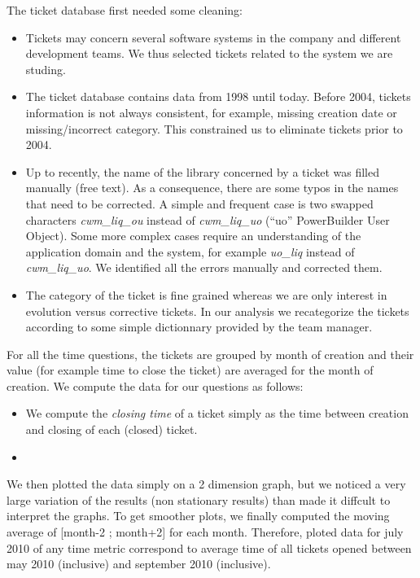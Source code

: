 \documentclass[10pt,conference]{IEEEtran}
\begin{document}
The ticket database first needed some cleaning:
\begin{itemize}
  \item Tickets may concern several software systems in the company and different development teams.
  We thus selected tickets related to the system we are studing.
  
  \item The ticket database contains data from 1998  until today. 
  Before 2004, tickets information is not always consistent, for example, missing creation date or missing/incorrect category.
  This constrained us to eliminate tickets prior to 2004.

  \item Up to recently, the name of the library concerned by a ticket was filled manually (free text).
  As a consequence, there are some typos in the names that need to be corrected.
  A simple and frequent case is two swapped characters \emph{cwm\_liq\_ou} instead of \emph{cwm\_liq\_uo} (``uo'' PowerBuilder User Object).
  Some more complex cases require an understanding of the application domain and the system, for example \emph{uo\_liq} instead of \emph{cwm\_liq\_uo}.
  We identified all the errors manually and corrected them.
  
  \item The category of the ticket is fine grained whereas we are only interest in evolution versus corrective tickets.
  In our analysis we recategorize the tickets according to some simple dictionnary provided by the team manager.
  
\end{itemize}
 
For all the time questions, the tickets are grouped by month of creation and their value (for example time to close the ticket) are averaged for the month of creation. 
We compute the data for our questions as follows:
\begin{itemize}
  \item We compute the \emph{closing time} of a ticket simply as the time between creation and closing of each (closed) ticket.
\item %
\end{itemize}

We then plotted the data simply on a 2 dimension graph, but we noticed a very large variation of the results (non stationary results) than made it diffcult to interpret the graphs.
To get smoother plots, we finally computed the moving average of [month-2 ; month+2] for each month.
Therefore, ploted data for july 2010 of any time metric correspond to average time of all tickets opened between may 2010 (inclusive) and september 2010 (inclusive).
\end{document}
